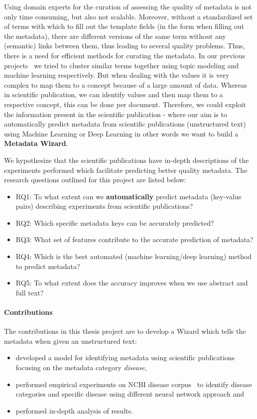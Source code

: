 Using domain experts for the curation of assessing the quality of metadata is not only time consuming, but also not scalable. 
Moreover, without a standardized set of terms with which to fill out the template fields (in the form when filling out the metadata), there are different versions of the same term without any (semantic) links between them, thus leading to several quality problems. Thus, there is a need for efficient methods for curating the metadata. In our previous projects~\cite{nayak2018quality, nayak2018ML} we tried to cluster similar terms together using topic modeling and machine learning respectively. But when dealing with the values it is very complex to map them to a concept because of a large amount of data. Whereas in scientific publication, we can identify values and then map them to a respective concept, this can be done per document. Therefore, we could exploit the information present in the scientific publication - where our aim is to automatically predict metadata from scientific publications (unstructured text) using Machine Learning or Deep Learning in other words we want to build a \textbf{Metadata Wizard}.

We hypothesize that the scientific publications have in-depth descriptions of the experiments performed which facilitate predicting better quality metadata. 
The research questions outlined for this project are listed below:
\begin{itemize}
    \item RQ1: To what extent can we \textbf{automatically} predict metadata (key-value pairs) describing experiments from scientific publications?%
    \item RQ2: Which specific metadata keys can be accurately predicted?
    \item RQ3: What set of features contribute to the accurate prediction of metadata?
    \item RQ4: Which is the best automated (machine learning/deep learning) method to predict metadata?
    \item RQ5: To what extent does the accuracy improves when we use abstract and full text?
\end{itemize}

\paragraph{Contributions} 
The contributions in this thesis project are to develop a Wizard which tells the metadata when given an unstructured text:
\begin{itemize}
\item  developed a model for identifying metadata using scientific publications focusing on the metadata category \emph{disease}, 
\item performed empirical experiments on NCBI disease corpus~\cite{dougan2014ncbi} to identify disease categories and specific disease using different neural network approach and \item performed in-depth analysis of results. 
\end{itemize}

